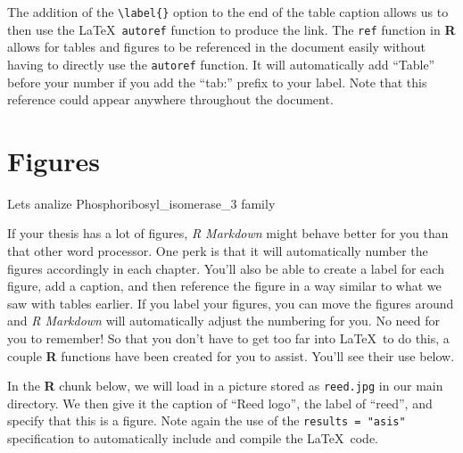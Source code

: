 \documentclass[12pt,twoside]{reedthesis}
\begin{document}
  The addition of the \texttt{\textbackslash{}label\{\}} option to the end
  of the table caption allows us to then use the \LaTeX~\texttt{autoref}
  function to produce the link. The \texttt{ref} function in \textbf{R}
  allows for tables and figures to be referenced in the document easily
  without having to directly use the \texttt{autoref} function. It will
  automatically add ``Table'' before your number if you add the ``tab:''
  prefix to your label. Note that this reference could appear anywhere
  throughout the document.
  
  \clearpage
  
  \section{Figures}\label{figures-2}
  
  Lets analize Phosphoribosyl\_isomerase\_3 family
  
  If your thesis has a lot of figures, \emph{R Markdown} might behave
  better for you than that other word processor. One perk is that it will
  automatically number the figures accordingly in each chapter. You'll
  also be able to create a label for each figure, add a caption, and then
  reference the figure in a way similar to what we saw with tables
  earlier. If you label your figures, you can move the figures around and
  \emph{R Markdown} will automatically adjust the numbering for you. No
  need for you to remember! So that you don't have to get too far into
  \LaTeX~to do this, a couple \textbf{R} functions have been created for
  you to assist. You'll see their use below.
  
  In the \textbf{R} chunk below, we will load in a picture stored as
  \texttt{reed.jpg} in our main directory. We then give it the caption of
  ``Reed logo'', the label of ``reed'', and specify that this is a figure.
  Note again the use of the \texttt{results\ =\ "asis"} specification to
  automatically include and compile the \LaTeX~code.
  
  \begin{Shaded}
  \begin{Highlighting}[]
  \NormalTok{(} \NormalTok{, } \NormalTok{, }
         \NormalTok{, } \NormalTok{)}
  \end{Highlighting}
  \end{Shaded}
  
\end{document}
